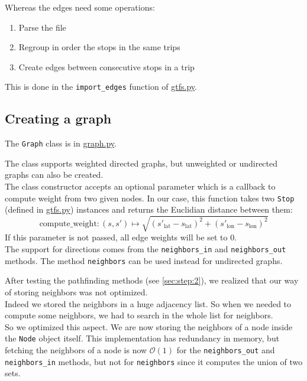 \documentclass[12pt,english]{article}
\begin{document}
	Whereas the edges need some operations:
	\begin{enumerate}
		\item Parse the file
		\item Regroup in order the stops in the same trips
		\item Create edges between consecutive stops in a trip
	\end{enumerate}
	This is done in the \texttt{import\_edges} function of \hyperref[sec:code:gtfs]{\ttfamily gtfs.py}.

	\subsection{Creating a graph}\label{sec:step:1.2}

	The \texttt{Graph} class is in \hyperref[sec:code:graph]{\ttfamily graph.py}.

	The class supports weighted directed graphs, but unweighted or undirected graphs can also be created.\\
	The class constructor accepts an optional parameter which is a callback to compute weight from two given nodes.
	In our case, this function takes two \texttt{Stop} (defined in \hyperref[sec:code:gtfs]{\ttfamily gtfs.py}) instances and returns the Euclidian distance between them: \[
		\text{compute\_weight}: (s,s') \mapsto \sqrt{\left(s'_\text{lat} - s_\text{lat}\right)^2 + \left(s'_\text{lon} - s_\text{lon}\right)^2}
	\]
	If this parameter is not passed, all edge weights will be set to \(0\).\\
	The support for directions comes from the \texttt{neighbors\_in} and \texttt{neighbors\_out} methods.
	The method \texttt{neighbors} can be used instead for undirected graphs.

	After testing the pathfinding methods (see \autoref{sec:step:2}), we realized that our way of storing neighbors was not optimized.\\
	Indeed we stored the neighbors in a huge adjacency list.
	So when we needed to compute some neighbors, we had to search in the whole list for neighbors.\\
	So we optimized this aspect.
	We are now storing the neighbors of a node inside the \texttt{Node} object itself.
	This implementation has redundancy in memory, but fetching the neighbors of a node is now \(\mathcal{O}(1)\) for the \texttt{neighbors\_out} and \texttt{neighbors\_in} methods, but not for \texttt{neighbors} since it computes the union of two sets.
\end{document}
